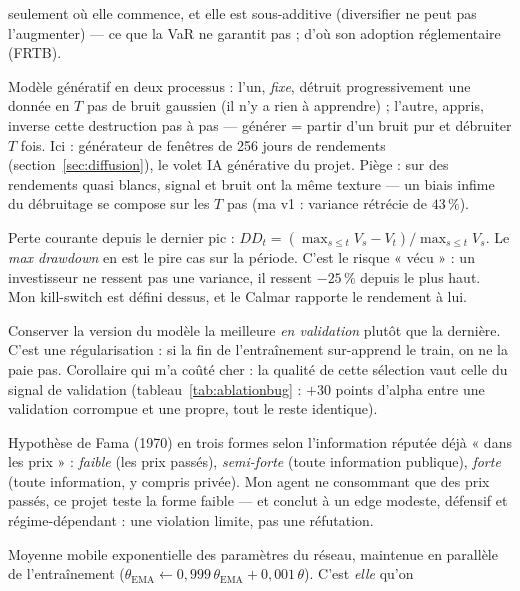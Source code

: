 \documentclass[11pt,a4paper]{article}
\begin{document}
\begin{description}[itemsep=4pt, font=\normalfont\bfseries]
        seulement où elle commence, et elle est sous-additive (diversifier ne peut pas
        l'augmenter) --- ce que la VaR ne garantit pas ; d'où son adoption
        réglementaire (FRTB).
  \item[DDPM (modèle de diffusion)] Modèle génératif en deux processus : l'un,
        \emph{fixe}, détruit progressivement une donnée en $T$ pas de bruit gaussien
        (il n'y a rien à apprendre) ; l'autre, appris, inverse cette destruction pas à
        pas --- générer = partir d'un bruit pur et débruiter $T$ fois. Ici : générateur
        de fenêtres de 256 jours de rendements (section~\ref{sec:diffusion}), le volet
        IA générative du projet. Piège : sur des rendements quasi blancs, signal et
        bruit ont la même texture --- un biais infime du débruitage se compose sur les
        $T$ pas (ma v1 : variance rétrécie de $43\,\%$).
  \item[Drawdown] Perte courante depuis le dernier pic :
        $DD_t = (\max_{s \le t} V_s - V_t)/\max_{s \le t} V_s$. Le \emph{max drawdown}
        en est le pire cas sur la période. C'est le risque « vécu » : un investisseur
        ne ressent pas une variance, il ressent $-25\,\%$ depuis le plus haut. Mon
        kill-switch est défini dessus, et le Calmar rapporte le rendement à lui.
  \item[Early stopping] Conserver la version du modèle la meilleure \emph{en
        validation} plutôt que la dernière. C'est une régularisation : si la fin de
        l'entraînement sur-apprend le train, on ne la paie pas. Corollaire qui m'a
        coûté cher : la qualité de cette sélection vaut celle du signal de validation
        (tableau~\ref{tab:ablationbug} : $+30$ points d'alpha entre une validation
        corrompue et une propre, tout le reste identique).
  \item[Efficience des marchés (EMH)] Hypothèse de Fama (1970) en trois formes selon
        l'information réputée déjà « dans les prix » : \emph{faible} (les prix
        passés), \emph{semi-forte} (toute information publique), \emph{forte} (toute
        information, y compris privée). Mon agent ne consommant que des prix passés,
        ce projet teste la forme faible --- et conclut à un edge modeste, défensif et
        régime-dépendant : une violation limite, pas une réfutation.
  \item[EMA (des poids)] Moyenne mobile exponentielle des paramètres du réseau,
        maintenue en parallèle de l'entraînement ($\theta_{\text{EMA}} \leftarrow
        0{,}999\,\theta_{\text{EMA}} + 0{,}001\,\theta$). C'est \emph{elle} qu'on

\end{description}
\end{document}
